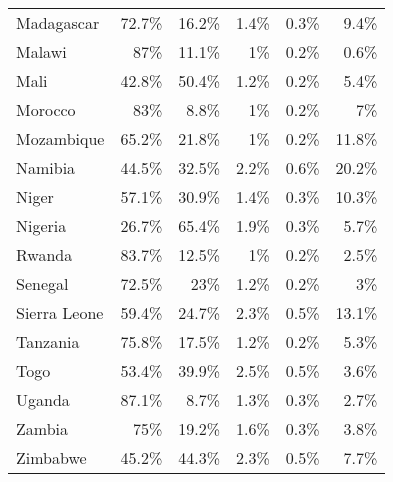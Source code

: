 \documentclass[12pt]{article}\usepackage[]{graphicx}\usepackage[]{color}
\begin{document}
\begin{longtable}{lrrrrr}
  Madagascar & 72.7\% & 16.2\% & 1.4\% & 0.3\% & 9.4\% \\ 
  Malawi & 87\% & 11.1\% & 1\% & 0.2\% & 0.6\% \\ 
  Mali & 42.8\% & 50.4\% & 1.2\% & 0.2\% & 5.4\% \\ 
  Morocco & 83\% & 8.8\% & 1\% & 0.2\% & 7\% \\ 
  Mozambique & 65.2\% & 21.8\% & 1\% & 0.2\% & 11.8\% \\ 
  Namibia & 44.5\% & 32.5\% & 2.2\% & 0.6\% & 20.2\% \\ 
  Niger & 57.1\% & 30.9\% & 1.4\% & 0.3\% & 10.3\% \\ 
  Nigeria & 26.7\% & 65.4\% & 1.9\% & 0.3\% & 5.7\% \\ 
  Rwanda & 83.7\% & 12.5\% & 1\% & 0.2\% & 2.5\% \\ 
  Senegal & 72.5\% & 23\% & 1.2\% & 0.2\% & 3\% \\ 
  Sierra Leone & 59.4\% & 24.7\% & 2.3\% & 0.5\% & 13.1\% \\ 
  Tanzania & 75.8\% & 17.5\% & 1.2\% & 0.2\% & 5.3\% \\ 
  Togo & 53.4\% & 39.9\% & 2.5\% & 0.5\% & 3.6\% \\ 
  Uganda & 87.1\% & 8.7\% & 1.3\% & 0.3\% & 2.7\% \\ 
  Zambia & 75\% & 19.2\% & 1.6\% & 0.3\% & 3.8\% \\ 
  Zimbabwe & 45.2\% & 44.3\% & 2.3\% & 0.5\% & 7.7\% \\ 
  \bottomrule
\end{longtable}
\end{document}
